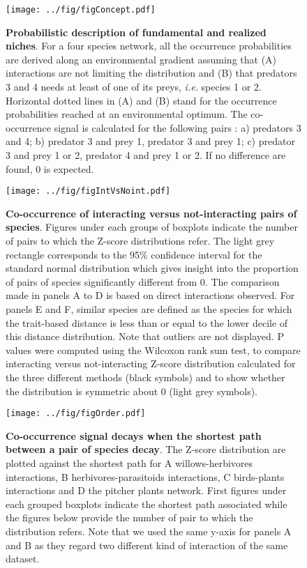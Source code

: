 \begin{figure}
\centering
\texttt{[image: ../fig/figConcept.pdf]}
\caption{\textbf{Probabilistic description of fundamental and realized
niches}. For a four species network, all the occurrence probabilities
are derived along an environmental gradient assuming that (A)
interactions are not limiting the distribution and (B) that predators 3
and 4 needs at least of one of its preys, \emph{i.e.} species 1 or 2.
Horizontal dotted lines in (A) and (B) stand for the occurrence
probabilities reached at an environmental optimum. The co-occurrence
signal is calculated for the following pairs : a) predators 3 and 4; b)
predator 3 and prey 1, predator 3 and prey 1; c) predator 3 and prey 1
or 2, predator 4 and prey 1 or 2. If no difference are found, 0 is
expected.\label{fig:box1}}
\end{figure}

\newpage

\begin{figure}
\centering
\texttt{[image: ../fig/figIntVsNoint.pdf]}
\caption{\textbf{Co-occurrence of interacting versus not-interacting
pairs of species}. Figures under each groups of boxplots indicate the
number of pairs to which the Z-score distributions refer. The light grey
rectangle corresponds to the 95\% confidence interval for the standard
normal distribution which gives insight into the proportion of pairs of
species significantly different from 0. The comparison made in panels A
to D is based on direct interactions observed. For panels E and F,
similar species are defined as the species for which the trait-based
distance is less than or equal to the lower decile of this distance
distribution. Note that outliers are not displayed. P values were
computed using the Wilcoxon rank sum test, to compare interacting versus
not-interacting Z-score distribution calculated for the three different
methods (black symbols) and to show whether the distribution is
symmetric about 0 (light grey symbols).\label{fig:synth}}
\end{figure}

\newpage

\begin{figure}
\centering
\texttt{[image: ../fig/figOrder.pdf]}
\caption{\textbf{Co-occurrence signal decays when the shortest path
between a pair of species decay}. The Z-score distribution are plotted
against the shortest path for A willows-herbivores interactions, B
herbivores-parasitoids interactions, C birds-plants interactions and D
the pitcher plants network. First figures under each grouped boxplots
indicate the shortest path associated while the figures below provide
the number of pair to which the distribution refers. Note that we used
the same y-axis for panels A and B as they regard two different kind of
interaction of the same dataset.\label{fig:shtpth}}
\end{figure}

